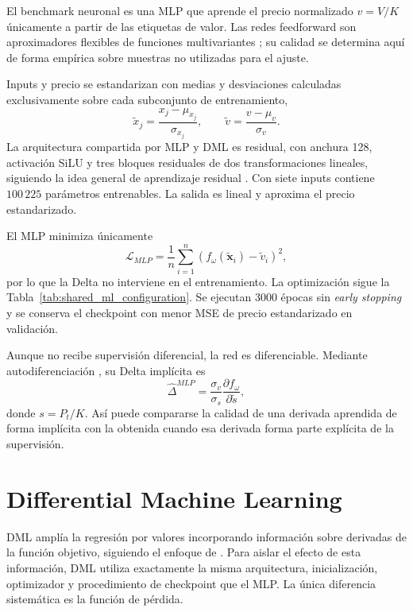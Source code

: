 El benchmark neuronal es una MLP que aprende el precio normalizado
$v=V/K$ únicamente a partir de las etiquetas de valor. Las redes feedforward son
aproximadores flexibles de funciones multivariantes \parencite{hornik1989}; su
calidad se determina aquí de forma empírica sobre muestras no utilizadas para el
ajuste.

Inputs y precio se estandarizan con medias y desviaciones calculadas
exclusivamente sobre cada subconjunto de entrenamiento,
\begin{equation}
    \widetilde x_j=\frac{x_j-\mu_{x_j}}{\sigma_{x_j}},\qquad
    \widetilde v=\frac{v-\mu_v}{\sigma_v}.
    \label{eq:input_standardization}
\end{equation}
La arquitectura compartida por MLP y DML es residual, con anchura 128, activación
SiLU y tres bloques residuales de dos transformaciones lineales, siguiendo la
idea general de aprendizaje residual \parencite{he_etal_2016}. Con siete inputs
contiene $100\,225$ parámetros entrenables. La salida es lineal y aproxima el
precio estandarizado.

El MLP minimiza únicamente
\begin{equation}
    \mathcal L_{MLP}
    =\frac{1}{n}\sum_{i=1}^{n}
    \left(f_{\omega}(\widetilde{\mathbf x}_i)-\widetilde v_i\right)^2,
    \label{eq:mlp_loss}
\end{equation}
por lo que la Delta no interviene en el entrenamiento. La optimización sigue la Tabla~\ref{tab:shared_ml_configuration}.
Se ejecutan 3000 épocas sin \textit{early stopping} y se conserva el checkpoint
con menor MSE de precio estandarizado en validación.

Aunque no recibe supervisión diferencial, la red es diferenciable. Mediante
autodiferenciación \parencite{baydin2018}, su Delta implícita es
\begin{equation}
    \widehat\Delta^{MLP}
    =\frac{\sigma_v}{\sigma_s}
    \frac{\partial f_\omega}{\partial\widetilde s},
    \label{eq:mlp_autograd_delta}
\end{equation}
donde $s=P_t/K$. Así puede compararse la calidad de una derivada aprendida de
forma implícita con la obtenida cuando esa derivada forma parte explícita de la
supervisión.


\section{Differential Machine Learning}
\label{sec:dml}

DML amplía la regresión por valores incorporando información sobre derivadas de
la función objetivo, siguiendo el enfoque de \textcite{huge_savine_2020}. Para
aislar el efecto de esta información, DML utiliza exactamente la misma
arquitectura, inicialización, optimizador y procedimiento de checkpoint que el
MLP. La única diferencia sistemática es la función de pérdida.

